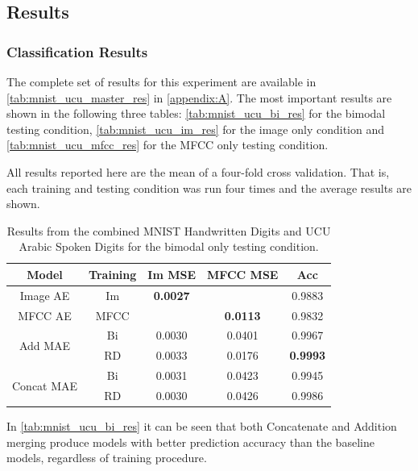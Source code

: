\begin{table}
	\end{table}




\subsection{Results}

\subsubsection{Classification Results}
The complete set of results for this experiment are available in \autoref{tab:mnist_ucu_master_res} in \autoref{appendix:A}. The most important results are shown in the following three tables: \autoref{tab:mnist_ucu_bi_res} for the bimodal testing condition, \autoref{tab:mnist_ucu_im_res} for the image only condition and \autoref{tab:mnist_ucu_mfcc_res} for the MFCC only testing condition. 

All results reported here are the mean of a four-fold cross validation. That is, each training and testing condition was run four times and the average results are shown.


\begin{table}
	\centering
		\begin{tabular}{|c|c|c|c|c|}
		\hline
		Model & Training & Im MSE & MFCC MSE &  Acc \\ \hline
				Image AE & Im & 	\textbf{0.0027}	&	       			& 	0.9883			\\ \hline		
				MFCC AE & MFCC & 		    		& 	\textbf{0.0113} &	0.9832			\\ \hline		
\multirow{2}{*}{Add MAE} & Bi & 	0.0030			&	0.0401			&	0.9967			\\ \cline{2-5}
						  & RD &	0.0033			&	0.0176			&	\textbf{0.9993}	\\ \hline	
		
\multirow{2}{*}{Concat MAE} & Bi & 0.0031			&	0.0423			&	0.9945			\\ \cline{2-5}		
							 & RD & 0.0030			&	0.0426			&	0.9986			\\ \hline
		\end{tabular}
		\caption{Results from the combined MNIST Handwritten Digits and UCU Arabic Spoken Digits for the bimodal only testing condition.}
		\label{tab:mnist_ucu_bi_res}

\end{table}

In \autoref{tab:mnist_ucu_bi_res} it can be seen that both Concatenate and Addition merging produce models with better prediction accuracy than the baseline models, regardless of training procedure.


